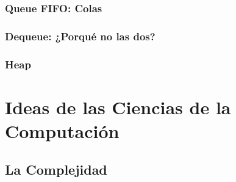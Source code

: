 \documentclass[12pt, fleqn]{report}                             %
\theoremstyle{break}                                            %
\begin{document}
        \clearpage
        \section{Queue FIFO: Colas}

        \clearpage
        \section{Dequeue: ¿Porqué no las dos?}

        \clearpage
        \section{Heap}


\part{Ideas de las Ciencias de la Computación}
\label{part:IdeasDeCienciasDeLaComputacion}
    

    \clearpage
    \chapter{La Complejidad}

\end{document}
